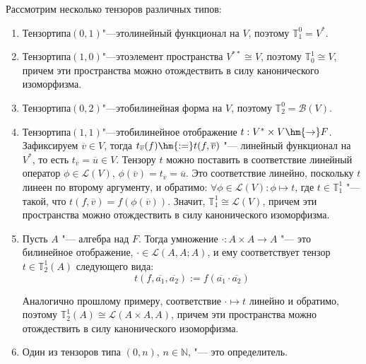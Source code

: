 \begin{example}
    Рассмотрим несколько тензоров различных типов:
    \begin{enumerate}
        \item Тензор\;типа\;$(0, 1)$\:"---\:это\;линейный функционал на $V$, поэтому $\mathbb{T}_1^0 = V^*$.
        
        \item Тензор\;типа\;$(1, 0)$\:"---\:это\;элемент пространства $V^{**} \cong V$, поэтому $\mathbb{T}^1_0 \cong V$, причем эти пространства можно отождествить в силу канонического изоморфизма.
        
        \item Тензор\;типа\;$(0, 2)$\:"---\:это\;билинейная форма на $V$, поэтому $\mathbb{T}^0_2 = \mathcal{B}(V)$.
        
        \item Тензор\;типа\;$(1, 1)$\:"---\:это\;билинейное отображение $t: V^* \times V \hm{\rightarrow} F$. Зафиксируем $\overline{v} \in V$, тогда $t_{\overline{v}}(f) \hm{:=} t(f, \overline{v})$ "--- линейный функционал на $V^*$, то есть $t_{\overline{v}} = \overline{u} \in V$. Тензору $t$ можно поставить в соответствие линейный оператор $\phi \in \mathcal{L}(V)$, $\phi(\overline{v}) = t_{\overline{v}} = \overline{u}$. Это соответствие линейно, поскольку $t$ линеен по второму аргументу, и обратимо: $\forall \phi \in \mathcal{L}(V): \phi \mapsto t$, где $t \in \mathbb{T}^1_1$ "--- такой, что $t(f, \overline{v}) = f(\phi(\overline{v}))$. Значит, $\mathbb{T}^1_1 \cong \mathcal{L}(V)$, причем эти пространства можно отождествить в силу канонического изоморфизма.
        
        \item Пусть $A$ "--- алгебра над $F$. Тогда умножение $\cdot: A \times A \rightarrow A$ "--- это билинейное отображение, $\cdot \in \mathcal{L}(A, A; A)$, и ему соответствует тензор $t \in \mathbb{T}^1_2(A)$ следующего вида:
        \[t(f, \overline{a_1}, \overline{a_2}) := f(\overline{a_1} \cdot \overline{a_2})\]
        
        Аналогично прошлому примеру, соответствие $\cdot \mapsto t$ линейно и обратимо, поэтому $\mathbb T^1_2(A) \cong \mathcal{L}(A \times A, A)$, причем эти пространства можно отождествить в силу канонического изоморфизма.
            
        \item Один из тензоров типа $(0, n)$, $n \in \mathbb{N}$, "--- это определитель.
    \end{enumerate}
\end{example}

